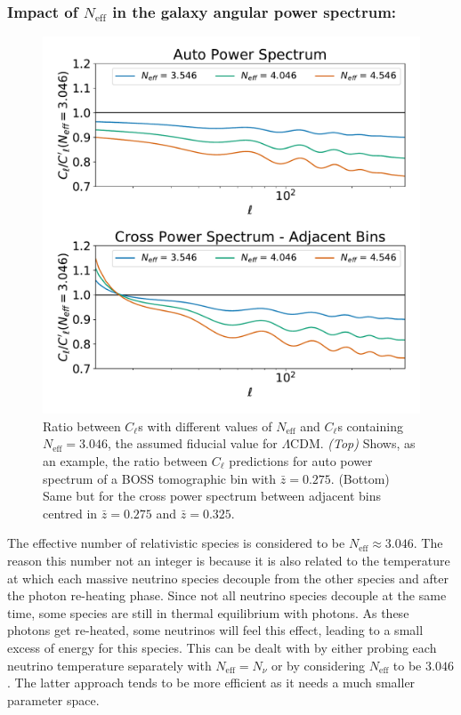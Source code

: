\subsubsection{Impact of $N_{\text{eff}}$ in the galaxy angular power spectrum:}
\begin{figure}
\begin{center}
\includegraphics[scale=0.50]{Neutrino-FIGS/Neutrinos_Neff.pdf}
\caption[Impact of the effective number of relativistic species in the angular power spectra of galaxies.]{Ratio between $C_{\ell}$s with different values of $N_{\text{eff}}$ and $C_{\ell}$s containing $N_{\text{eff}} = 3.046$, the assumed fiducial value for $\Lambda$CDM. \textit{(Top)} Shows, as an example, the ratio between $C_{\ell}$ predictions for auto power spectrum of a BOSS tomographic bin with $\bar{z} = 0.275$. (Bottom) Same but for the cross power spectrum between adjacent bins centred in $\bar{z} = 0.275$ and $\bar{z} = 0.325$.}
\label{fig:neutrinoCompareNeff}
\end{center}
\end{figure}

The effective number of relativistic species is considered to be $N_{\text{eff}}\approx 3.046$. The reason this number not an integer is because it is also related to the temperature at which each massive neutrino species decouple from the other species and after the photon re-heating phase. Since not all neutrino species decouple at the same time, some species are still in thermal equilibrium with photons. As these photons get re-heated, some neutrinos will feel this effect, leading to a small excess of energy for this species. This can be dealt with by either probing each neutrino temperature separately with $N_{\text{eff}}=N_{\nu}$ or by considering $N_{\text{eff}}$ to be $3.046$. The latter approach tends to be more efficient as it needs a much smaller parameter space.

